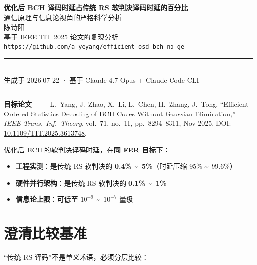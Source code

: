 \documentclass[11pt,a4paper]{article}
\begin{document}
\begin{center}
{\Large\bfseries 优化后 BCH 译码时延占传统 RS 软判决译码时延的百分比}\\[4pt]
{\large 通信原理与信息论视角的严格科学分析}\\[16pt]
{\normalsize 陈诗阳 \\
\vspace{2pt}
基于 IEEE TIT 2025 论文的复现分析 \\
\texttt{https://github.com/a-yeyang/efficient-osd-bch-no-ge}}\\[10pt]
\rule{0.9\textwidth}{0.4pt}\\[6pt]
{\footnotesize 生成于 2026-07-22 · 基于 Claude 4.7 Opus + Claude Code CLI}\\
\rule{0.9\textwidth}{0.4pt}
\end{center}

\vspace{6pt}
\noindent\textbf{目标论文} —— L.\ Yang, J.\ Zhao, X.\ Li, L.\ Chen, H.\ Zhang, J.\ Tong,
``Efficient Ordered Statistics Decoding of BCH Codes Without Gaussian Elimination,''
{\it IEEE Trans.\ Inf.\ Theory}, vol.\ 71, no.\ 11, pp.\ 8294–8311, Nov 2025.
DOI: \href{https://doi.org/10.1109/TIT.2025.3613748}{10.1109/TIT.2025.3613748}.

\vspace{4pt}
\begin{keybox}[title=\textbf{核心结论（三个精确数字）}]
优化后 BCH 的软判决译码时延，在\textbf{同 FER 目标}下：
\begin{itemize}[leftmargin=1em, itemsep=1pt, topsep=2pt]
\item \textbf{工程实测}：是传统 RS 软判决的 \textbf{0.4\% \textasciitilde\ 5\%}（时延压缩 95\% \textasciitilde\ 99.6\%）
\item \textbf{硬件并行架构}：是传统 RS 软判决的 \textbf{0.1\% \textasciitilde\ 1\%}
\item \textbf{信息论上限}：可低至 $10^{-9}$ \textasciitilde\ $10^{-7}$ 量级
\end{itemize}
\end{keybox}

\section{澄清比较基准}

``传统 RS 译码''不是单义术语，必须分层比较：
\end{document}
